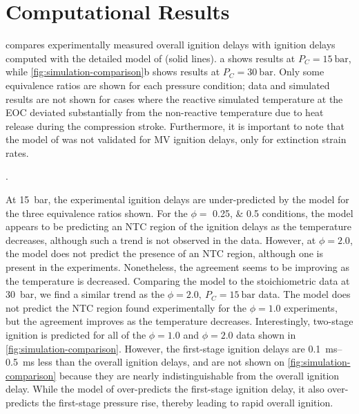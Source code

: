 \documentclass[letterpaper, review, sort&compress]{elsarticle}
\begin{document}
\section{Computational Results}\label{sec:computational-results}

 compares experimentally measured overall ignition delays with
ignition delays computed with the detailed model of \citet{Dievart2013} (solid lines).
a shows results at \(P_C = \SI{15}{\bar}\), while
\cref{fig:simulation-comparison}b shows results at \(P_C = \SI{30}{\bar}\). Only some equivalence
ratios are shown for each pressure condition; data and simulated results are not shown for cases
where the reactive simulated temperature at the EOC deviated substantially from the non-reactive
temperature due to heat release during the compression stroke. Furthermore, it is important to note
that the model of \citet{Dievart2013} was not validated for MV ignition delays, only for extinction
strain rates.

\begin{center}
    \captionsetup{type=figure}
    \resizebox{\textwidth}{!}{}
    \caption{Comparison of experimental and simulated results. a) \SI{15}{\bar}, b) \SI{30}{\bar}}.
    \label{fig:simulation-comparison}
\end{center}

At \SI{15}{\bar}, the experimental ignition delays are under-predicted by the \citet{Dievart2013}
model for the three equivalence ratios shown. For the \(\phi =\) \numlist{0.25;0.5} conditions, the
model appears to be predicting an NTC region of the ignition delays as the temperature decreases,
although such a trend is not observed in the data. However, at \(\phi = 2.0\), the model does not
predict the presence of an NTC region, although one is present in the experiments. Nonetheless, the
agreement seems to be improving as the temperature is decreased. Comparing the \citet{Dievart2013}
model to the stoichiometric data at \SI{30}{\bar}, we find a similar trend as the \(\phi=2.0,\
P_C=\SI{15}{\bar}\) data. The model does not predict the NTC region found experimentally for the
\(\phi = 1.0\) experiments, but the agreement improves as the temperature decreases. Interestingly,
two-stage ignition is predicted for all of the \(\phi=1.0\) and \(\phi=2.0\) data shown in
\cref{fig:simulation-comparison}. However, the first-stage ignition delays are
\SIrange{0.1}{0.5}{\ms} less than the overall ignition delays, and are not shown on
\cref{fig:simulation-comparison} because they are nearly indistinguishable from the overall ignition
delay. While the model of \citet{Dievart2013} over-predicts the first-stage ignition delay, it also
over-predicts the first-stage pressure rise, thereby leading to rapid overall ignition.
\end{document}
